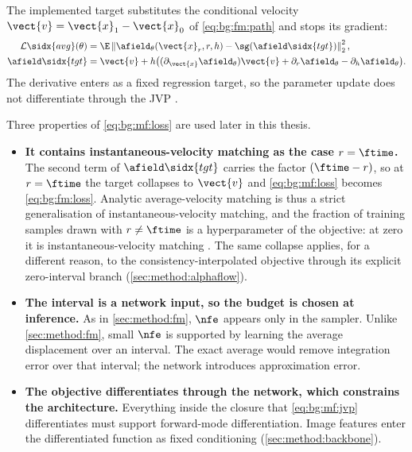 The implemented target substitutes the conditional velocity
$\vect{v}=\vect{x}_{1}-\vect{x}_{0}$ of \eqref{eq:bg:fm:path} and stops its gradient:
\begin{equation}\label{eq:bg:mf:loss}
\begin{aligned}
  \mathcal{L}\sidx{avg}(\theta)
    &=\E\left\|\afield_{\theta}(\vect{x}_{r},r,h)
           -\sg(\afield\sidx{tgt})\right\|_{2}^{2},\\
  \afield\sidx{tgt}
    &=\vect{v}+h\big((\partial_{\vect{x}}\afield_{\theta})\vect{v}
                     +\partial_{r}\afield_{\theta}-\partial_{h}\afield_{\theta}\big).
\end{aligned}
\end{equation}
The derivative enters as a fixed regression target, so the parameter update does not differentiate
through the JVP \parencite[Eqs.~(7)--(11)]{geng2025meanflow}.

Three properties of \eqref{eq:bg:mf:loss} are used later in this thesis.

\begin{itemize}
  \item \textbf{It contains instantaneous-velocity matching as the case $r = \ftime$.} The second term of
    $\afield\sidx{tgt}$ carries the factor $(\ftime-r)$, so at $r=\ftime$ the target collapses to
    $\vect{v}$ and \eqref{eq:bg:mf:loss} becomes \eqref{eq:bg:fm:loss}. Analytic
    average-velocity matching is thus a strict generalisation of instantaneous-velocity matching, and the fraction of training
    samples drawn with $r \neq \ftime$ is a hyperparameter of the objective: at zero it is
    instantaneous-velocity matching
    \parencite[Tab.~1a]{geng2025meanflow}. The same collapse applies, for a different reason, to the
    consistency-interpolated objective through its explicit zero-interval branch
    (\autoref{sec:method:alphaflow}).
  \item \textbf{The interval is a network input, so the budget is chosen at inference.} As in
    \autoref{sec:method:fm}, $\nfe$ appears only in the sampler. Unlike \autoref{sec:method:fm}, small $\nfe$ is
    supported by learning the average displacement over an interval. The exact average would
    remove integration error over that interval; the network introduces approximation error.
  \item \textbf{The objective differentiates through the network, which constrains the
    architecture.} Everything inside the closure that \eqref{eq:bg:mf:jvp} differentiates must
    support forward-mode differentiation. Image features enter the differentiated function as
    fixed conditioning (\autoref{sec:method:backbone}).
\end{itemize}

